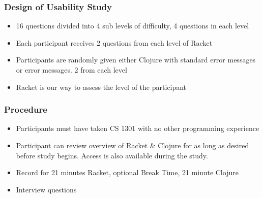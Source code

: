 \documentclass{beamer}
\begin{document}
\begin{frame}
  \frametitle{Design of Usability Study}
\begin{itemize}
\item 16 questions divided into 4 sub levels of difficulty, 4 questions in each level
\item Each participant receives 2 questions from each level of Racket
\item Participants are randomly given either Clojure with standard error messages or  error messages. 2 from each level 
\item Racket is our way to assess the level of the participant
\end{itemize} 
\end{frame}




\begin{frame}
  \frametitle{Procedure}
\begin{itemize}

\item Participants must have taken CS 1301 with no other programming experience
\item Participant can review overview of Racket \& Clojure for as long as desired before study begins. Access is also available during the study.
\item Record for 21 minutes Racket, optional Break Time, 21 minute Clojure
\item Interview questions
  
\end{itemize}  
\end{frame}
\end{document}
